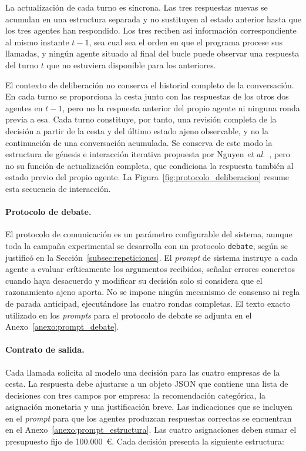 La actualización de cada turno es síncrona. Las tres respuestas nuevas se acumulan en una estructura separada y no sustituyen al estado anterior hasta que los tres agentes han respondido. Los tres reciben así información correspondiente al mismo instante $t-1$, sea cual sea el orden en que el programa procese sus llamadas, y ningún agente situado al final del bucle puede observar una respuesta del turno $t$ que no estuviera disponible para los anteriores.

El contexto de deliberación no conserva el historial completo de la conversación. En cada turno se proporciona la cesta junto con las respuestas de los otros dos agentes en $t-1$, pero no la respuesta anterior del propio agente ni ninguna ronda previa a esa. Cada turno constituye, por tanto, una revisión completa de la decisión a partir de la cesta y del último estado ajeno observable, y no la continuación de una conversación acumulada. Se conserva de este modo la estructura de génesis e interacción iterativa propuesta por Nguyen \textit{et al.}~\cite{nguyen2025social}, pero no su función de actualización completa, que condiciona la respuesta también al estado previo del propio agente. La Figura~\ref{fig:protocolo_deliberacion} resume esta secuencia de interacción.



\FloatBarrier

\paragraph{Protocolo de debate.}
El protocolo de comunicación es un parámetro configurable del sistema, aunque toda la campaña experimental se desarrolla con un protocolo \texttt{debate}, según se justificó en la Sección~\ref{subsec:repeticiones}. El \textit{prompt} de sistema instruye a cada agente a evaluar críticamente los argumentos recibidos, señalar errores concretos cuando haya desacuerdo y modificar su decisión solo si considera que el razonamiento ajeno aporta. No se impone ningún mecanismo de consenso ni regla de parada anticipad, ejecutándose las cuatro rondas completas. El texto exacto utilizado en los \textit{prompts} para el protocolo de debate se adjunta en el Anexo~\ref{anexo:prompt_debate}.

\paragraph{Contrato de salida.}
Cada llamada solicita al modelo una decisión para las cuatro empresas de la cesta. La respuesta debe ajustarse a un objeto JSON que contiene una lista de decisiones con tres campos por empresa: la recomendación categórica, la asignación monetaria y una justificación breve. Las indicaciones que se incluyen en el \textit{prompt} para que los agentes produzcan respuestas correctas se encuentran en el Anexo~\ref{anexo:prompt_estructura}. Las cuatro asignaciones deben sumar el presupuesto fijo de 100.000~€. Cada decisión presenta la siguiente estructura:

